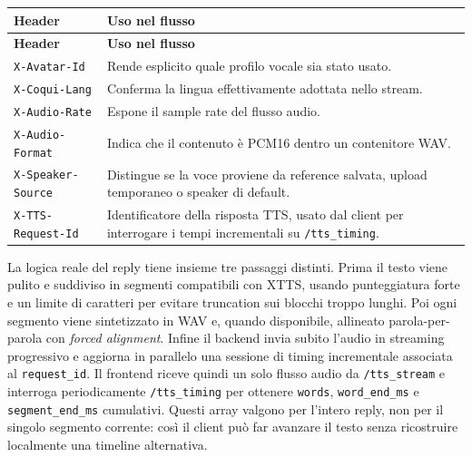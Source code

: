 \par\begingroup
\small
\setlength{\LTleft}{0pt}
\setlength{\LTright}{0pt}
\captionsetup{type=table}
\label{tab:appendix-tts-stream-headers}
\begin{longtable}{|>{\raggedright\arraybackslash}p{}|>{\raggedright\arraybackslash}p{}|}
\hline
\textbf{Header} & \textbf{Uso nel flusso} \\
\hline
\endfirsthead
\hline
\textbf{Header} & \textbf{Uso nel flusso} \\
\hline
\endhead
\texttt{X-Avatar-Id} & Rende esplicito quale profilo vocale sia stato usato. \\
\hline
\texttt{X-Coqui-Lang} & Conferma la lingua effettivamente adottata nello stream. \\
\hline
\texttt{X-Audio-Rate} & Espone il sample rate del flusso audio. \\
\hline
\texttt{X-Audio-Format} & Indica che il contenuto è PCM16 dentro un contenitore WAV. \\
\hline
\texttt{X-Speaker-Source} & Distingue se la voce proviene da reference salvata, upload temporaneo o speaker di default. \\
\hline
\texttt{X-TTS-Request-Id} & Identificatore della risposta TTS, usato dal client per interrogare i tempi incrementali su \texttt{/tts\_timing}. \\
\hline
\end{longtable}
\par\endgroup

La logica reale del reply tiene insieme tre passaggi distinti. Prima il testo viene pulito e suddiviso in segmenti compatibili con XTTS, usando punteggiatura forte e un limite di caratteri per evitare truncation sui blocchi troppo lunghi. Poi ogni segmento viene sintetizzato in WAV e, quando disponibile, allineato parola-per-parola con \emph{forced alignment}. Infine il backend invia subito l'audio in streaming progressivo e aggiorna in parallelo una sessione di timing incrementale associata al \texttt{request\_id}. Il frontend riceve quindi un solo flusso audio da \texttt{/tts\_stream} e interroga periodicamente \texttt{/tts\_timing} per ottenere \texttt{words}, \texttt{word\_end\_ms} e \texttt{segment\_end\_ms} cumulativi. Questi array valgono per l'intero reply, non per il singolo segmento corrente: così il client può far avanzare il testo senza ricostruire localmente una timeline alternativa.

